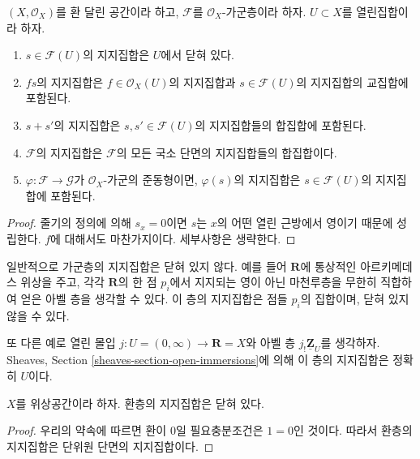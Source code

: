 \begin{lemma}
\label{lemma-support-section-closed}
$(X, \mathcal{O}_X)$를 환 달린 공간이라 하고, $\mathcal{F}$를
$\mathcal{O}_X$-가군층이라 하자. $U \subset X$를 열린집합이라 하자.
\begin{enumerate}
\item $s \in \mathcal{F}(U)$의 지지집합은 $U$에서 닫혀 있다.
\item $fs$의 지지집합은 $f \in \mathcal{O}_X(U)$의 지지집합과
$s \in \mathcal{F}(U)$의 지지집합의 교집합에 포함된다.
\item $s + s'$의 지지집합은 $s, s' \in \mathcal{F}(U)$의 지지집합들의
합집합에 포함된다.
\item $\mathcal{F}$의 지지집합은 $\mathcal{F}$의 모든 국소 단면의
지지집합들의 합집합이다.
\item $\varphi : \mathcal{F} \to \mathcal{G}$가 $\mathcal{O}_X$-가군의
준동형이면, $\varphi(s)$의 지지집합은 $s \in \mathcal{F}(U)$의
지지집합에 포함된다.
\end{enumerate}
\end{lemma}

\begin{proof}
줄기의 정의에 의해 $s_x = 0$이면 $s$는 $x$의 어떤 열린 근방에서 영이기
때문에 성립한다. $f$에 대해서도 마찬가지이다. 세부사항은 생략한다.
\end{proof}

\noindent
일반적으로 가군층의 지지집합은 닫혀 있지 않다. 예를 들어
$\mathbf{R}$에 통상적인 아르키메데스 위상을 주고, 각각 $\mathbf{R}$의 한 점
$p_i$에서 지지되는 영이 아닌 마천루층을 무한히 직합하여 얻은 아벨 층을
생각할 수 있다. 이 층의 지지집합은 점들 $p_i$의 집합이며, 닫혀 있지 않을 수 있다.

\medskip\noindent
또 다른 예로 열린 몰입 $j : U = (0 , \infty) \to \mathbf{R} = X$와
아벨 층 $j_!\underline{\mathbf{Z}}_U$를 생각하자. Sheaves, Section
\ref{sheaves-section-open-immersions}에 의해 이 층의 지지집합은 정확히 $U$이다.

\begin{lemma}
\label{lemma-support-sheaf-rings-closed}
$X$를 위상공간이라 하자. 환층의 지지집합은 닫혀 있다.
\end{lemma}

\begin{proof}
우리의 약속에 따르면 환이 $0$일 필요충분조건은 $1 = 0$인 것이다.
따라서 환층의 지지집합은 단위원 단면의 지지집합이다.
\end{proof}







